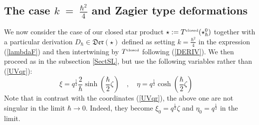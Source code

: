 \documentclass{article}
\begin{document}
\subsection{The case $k\;=\;\frac{\hbar^2}{4}$ and Zagier type deformations}
We now consider the case of our closed star product $\star:=T^{\mbox{\tiny{\rm closed}}}(\star^0_\hbar)$
together with a particular derivation $D_\hbar\in\mathfrak{Der}(\star)$ defined as setting $k=\frac{\hbar^2}{4}$ in the
expression (\ref{lambdaF}) and then intertwining by $T^{\mbox{\tiny{\rm closed}}}$ following (\ref{DERIV}).
We then proceed as in the subsection \ref{SectSL}, but use the following variables rather than (\ref{UVqr}):
\begin{equation}\label{UVqrbis}
\xi = q^{\frac{1}{2}}\frac{2}{\hbar}\sinh(\frac{\hbar}{2}\zeta) \quad, \quad \eta =
q^{\frac{1}{2}}\cosh(\frac{\hbar}{2}\zeta)  \quad
\end{equation}
Note that in contrast with the coordinates (\ref{UVqr}), the above one are not singular in the limit $\hbar\to 0$. Indeed, they become $\xi_0=q^{\frac{1}{2}}\zeta$ and $\eta_0=q^{\frac{1}{2}}$ in the limit.
\end{document}
